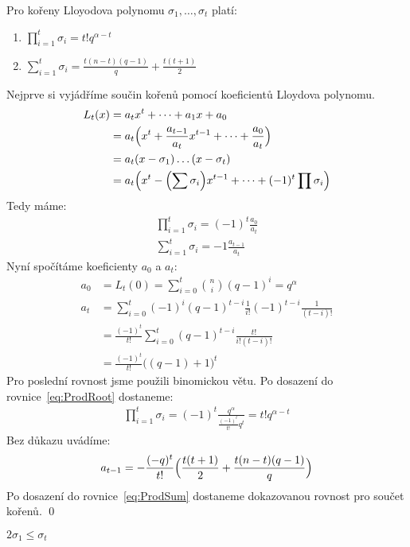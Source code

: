 \lm Pro kořeny Lloyodova polynomu $\sigma_1, \dots, \sigma_t$ platí:
\begin{enumerate}
\item $\prod\limits_{i = 1}^{t} \sigma_i = t!q^{\alpha - t}$
\item $\sum\limits_{i = 1}^{t} \sigma_i = \frac{t(n-t)(q-1)}{q} + \frac{t(t+1)}{2}$
\end{enumerate}


\dk Nejprve si vyjádříme součin kořenů pomocí koeficientů Lloydova polynomu.
\begin{align*}
L_t(x) &= a_t x^t + \dots + a_1x + a_0 \\
&= a_t \Bigl(x^t + \frac{a_{t-1}}{a_t}x^{t-1} + \dots + \frac{a_0}{a_t}\Bigr) \\
&= a_t (x - \sigma_1)\dots(x - \sigma_t) \\
&= a_t\Bigl(x^t - \Bigl(\sum \sigma_i\Bigr)x^{t-1} + \dots + (-1)^t \prod \sigma_i\Bigr)
\end{align*}
Tedy máme:
\begin{align}
\prod\limits_{i = 1}^{t} \sigma_i = (-1)^t \frac{a_0}{a_t} \label{eq:ProdRoot} \\
\sum\limits_{i = 1}^{t} \sigma_i = -1 \frac{a_{t-1}}{a_t} \label{eq:ProdSum}
\end{align}
Nyní spočítáme koeficienty $a_0$ a $a_t$:
\begin{align*}
a_0 &= L_t(0) = \sum\limits_{i = 0}^{t} {n \choose i}(q - 1)^i = q^\alpha \\
a_t &= \sum\limits_{i = 0}^{t} (-1)^i (q - 1)^{t - i} \frac{1}{i!}(-1)^{t-i} \frac{1}{(t-i)!} \\
&= \frac{(-1)^t}{t!}\sum\limits_{i = 0}^{t}(q-1)^{t-i} \frac{t!}{i!(t-i)!} \\
&= \frac{(-1)^t}{t!}\bigl((q - 1) + 1\bigr)^t
\end{align*}
Pro poslední rovnost jsme použili binomickou větu. Po dosazení do rovnice~\ref{eq:ProdRoot} dostaneme:
\begin{align*}
\prod\limits_{i = 1}^{t} \sigma_i = (-1)^t \frac{q^\alpha}{\frac{(-1)^t}{t!}q^t} = t!q^{\alpha-t}
\end{align*}
Bez důkazu uvádíme:
\begin{align*}
a_{t-1} = - \frac{(-q)^t}{t!}\Bigl(\frac{t(t+1)}{2} + \frac{t(n-t)(q - 1)}{q}\Bigr) 
\end{align*}
Po dosazení do rovnice~\ref{eq:ProdSum} dostaneme dokazovanou rovnost pro součet kořenů.
\qed

\lm $2 \sigma_1 \leq \sigma_t$

